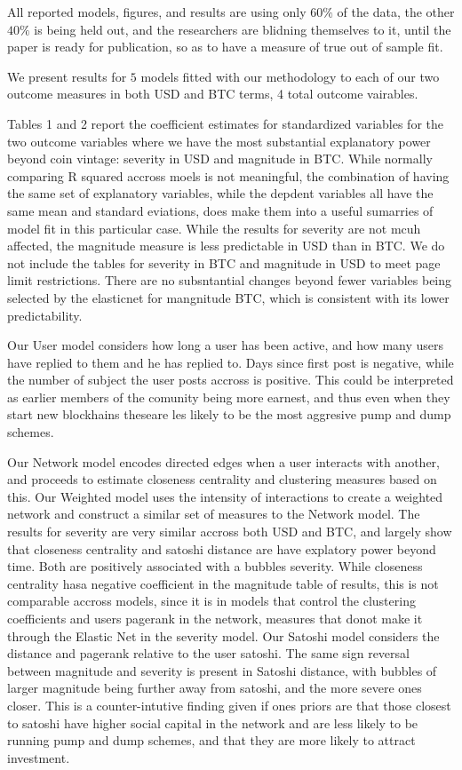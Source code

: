 All reported models, figures, and results are using only $60\%$ of the data, the other $40\%$ is being held out, and the researchers are blidning themselves to it, until the paper is ready for publication, so as to have a measure of true out of sample fit. 

We present results for $5$ models fitted with our methodology to each of our two outcome measures in both USD and BTC terms, 4 total outcome vairables.

Tables 1 and 2 report the coefficient estimates for standardized variables for the two outcome variables where we have the most substantial explanatory power beyond coin vintage: severity in USD and magnitude in BTC. While normally comparing R squared accross moels is not meaningful, the combination of having the same set of explanatory variables, while the depdent variables all have the same mean and standard eviations, does make them into a useful sumarries of model fit in this particular case. 
While the results for severity are not mcuh affected, the magnitude measure is less predictable in USD than in BTC.
We do not include the tables for severity in BTC and magnitude in USD to meet page limit restrictions.
There are no subsntantial changes beyond fewer variables being selected by the elasticnet for mangnitude BTC, which is consistent with its lower predictability.

Our User model considers how long a user has been active, and how many users have replied to them and he has replied to. 
Days since first post is negative, while the number of subject the user posts accross is positive. This could be interpreted as earlier members of the comunity being more earnest, and thus even when they start new blockhains theseare les likely to be the most aggresive pump and dump schemes. 

Our Network model encodes directed edges when a user interacts with another, and proceeds to estimate closeness centrality and clustering measures based on this. 
Our Weighted model uses the intensity of interactions to create a weighted network and construct a similar set of measures to the Network model.
The results for severity are very similar accross both USD and BTC, and largely show that closeness centrality and satoshi distance are have explatory power beyond time. Both  are positively associated with a bubbles severity.
While closeness centrality hasa negative coefficient in the magnitude table of results, this is not comparable accross models, since it is in models that control the clustering coefficients and users pagerank in the network, measures that donot make it through the Elastic Net in the severity model. 
Our Satoshi model considers the distance and pagerank relative to the user satoshi.
The same sign reversal between magnitude and severity is present in Satoshi distance, with bubbles of larger magnitude being further away from satoshi, and the more severe ones closer.
This is a counter-intutive finding given if ones priors are that those closest to satoshi have higher social capital in the network and are less likely to be running pump and dump schemes, and that they are more likely to attract investment. 

